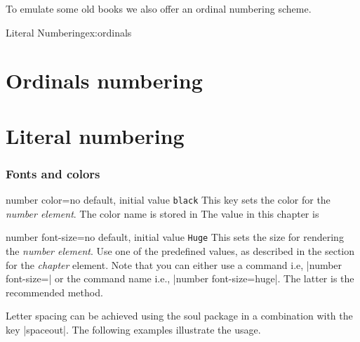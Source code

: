 To emulate some old books we also offer an ordinal numbering scheme.

\begin{texexample}{Literal Numbering}{ex:ordinals}
\chapter{Ordinals numbering}
\lorem
{}
\chapter{Literal numbering} 
\lorem
\end{texexample}


\subsection{Fonts and colors}
\begin{docKey}[phd]{number color}{=}{no default, initial value \texttt{black}}
This key sets the color for the \textit{number element}. The color name is stored in %
The value in this chapter is %
\end{docKey}

\begin{docKey}[phd]{number font-size}{=}{no default, initial value \texttt{Huge}}
This sets the size for rendering the \textit{number element}. Use one of the predefined values, as described
in the section for the \emph{chapter} element.
Note that you can either use a command i.e, |number font-size=|\cmd{\huge} 
or the command name i.e., |number font-size=huge|. The latter is the recommended method.
\end{docKey}

Letter spacing can be achieved using the soul package in a combination with the key |spaceout|.
The following examples illustrate the usage.


%

